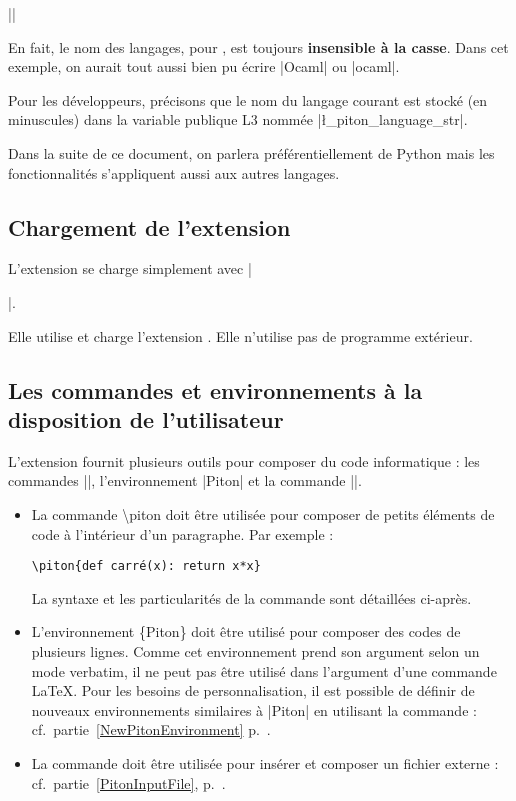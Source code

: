 \documentclass[dvipsnames,svgnames]{article}
\begin{document}
\smallskip
||

\smallskip
En fait, le nom des langages, pour , est toujours \textbf{insensible à la
  casse}. Dans cet exemple, on aurait tout aussi bien pu écrire |Ocaml| ou |ocaml|.

\smallskip
Pour les développeurs, précisons que le nom du langage courant est stocké (en minuscules)
dans la variable publique L3 nommée |\l_piton_language_str|.

\smallskip
Dans la suite de ce document, on parlera préférentiellement de Python mais les
fonctionnalités s'appliquent aussi aux autres langages.



\subsection{Chargement de l'extension}


L'extension  se charge simplement avec |\usepackage{piton}|.

\smallskip
Elle utilise et charge l'extension . Elle n'utilise pas de programme
extérieur. 

\subsection{Les commandes et environnements à la disposition de l'utilisateur}


L'extension  fournit plusieurs outils pour composer du code informatique : les
commandes |\piton|, l'environnement |{Piton}| et la commande |\PitonInputFile|.

\begin{itemize} \setlength{\fboxsep}{1pt}
\item La commande \colorbox{gray!20}{\ttfamily \textbackslash piton} doit être utilisée
pour composer de petits éléments de code à l'intérieur d'un paragraphe. Par exemple :

{\color{gray}\verb|\piton{def carré(x): return x*x}|}\qquad 
{}

La syntaxe et les particularités de la commande sont détaillées ci-après.


\item L'environnement \colorbox{gray!20}{\ttfamily \{Piton\}} doit être utilisé pour
composer des codes de plusieurs lignes. Comme cet environnement prend son argument selon
un mode verbatim, il ne peut pas être utilisé dans l'argument d'une commande LaTeX. Pour
les besoins de personnalisation, il est possible de définir de nouveaux environnements
similaires à |{Piton}| en utilisant la commande  :
cf.~partie~\ref{NewPitonEnvironment} p.~\pageref{NewPitonEnvironment}.

\item La commande  doit être utilisée pour insérer et
composer un fichier externe : cf.~partie~\ref{PitonInputFile},
p.~\pageref{PitonInputFile}.
\end{itemize}
\end{document}
